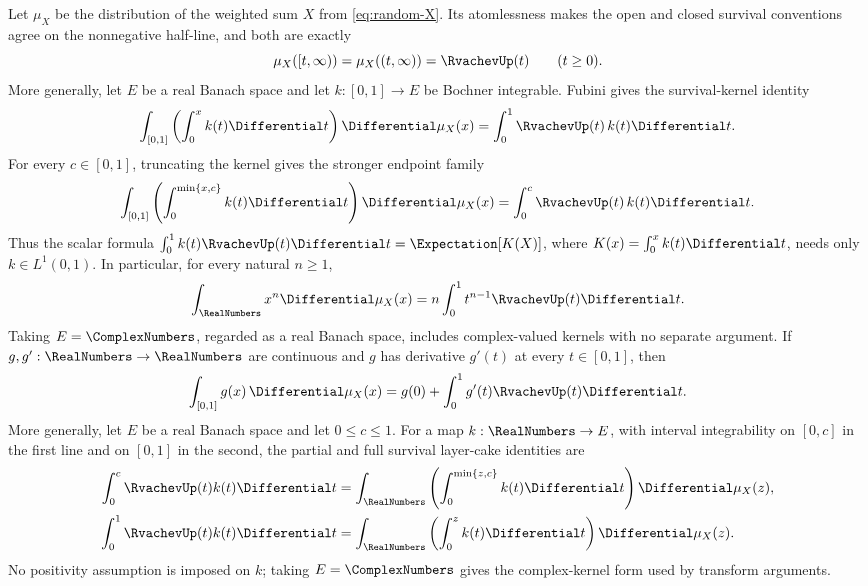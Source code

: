 \documentclass[11pt,oneside]{article}
\theoremstyle{definition}
\theoremstyle{remark}
\begin{document}
Let \(\mu_X\) be the distribution of the weighted sum \(X\) from
\eqref{eq:random-X}.  Its atomlessness makes the open and closed survival
conventions agree on the nonnegative half-line, and both are exactly
\begin{equation}
 \mu_X([t,\infty))=\mu_X((t,\infty))=\RvachevUp(t)
 \qquad(t\ge0).                                                   \label{eq:survival-up}
\end{equation}
More generally, let \(E\) be a real Banach space and let
\(k:[0,1]\to E\) be Bochner integrable.  Fubini gives the
survival-kernel identity
\begin{equation}
 \int_{[0,1]}\left(\int_0^x k(t)\Differential t\right)\Differential\mu_X(x)
 =\int_0^1\RvachevUp(t)\,k(t)\Differential t.                              \label{eq:survival-kernel-banach}
\end{equation}
For every \(c\in[0,1]\), truncating the kernel gives the stronger endpoint
family
\begin{equation}
 \int_{[0,1]}\left(\int_0^{\min\{x,c\}} k(t)\Differential t\right)\Differential\mu_X(x)
 =\int_0^c\RvachevUp(t)\,k(t)\Differential t.                              \label{eq:survival-kernel-clipped}
\end{equation}
Thus the scalar formula
\(\int_0^1 k(t)\RvachevUp(t)\Differential t=\Expectation[K(X)]\), where
\(K(x)=\int_0^xk(t)\Differential t\), needs only \(k\in L^1(0,1)\).
In particular, for every natural \(n\ge1\),
\begin{equation}
 \int_{\RealNumbers}x^n\Differential\mu_X(x)
 =n\int_0^1t^{n-1}\RvachevUp(t)\Differential t.                  \label{eq:survival-up-moments}
\end{equation}
Taking \(E=\ComplexNumbers\), regarded as a real Banach space, includes complex-valued
kernels with no separate argument.
If \(g,g':\RealNumbers\to\RealNumbers\) are continuous and \(g\) has derivative \(g'(t)\) at every
\(t\in[0,1]\), then
\begin{equation}
 \int_{[0,1]}g(x)\,\Differential\mu_X(x)
 =g(0)+\int_0^1g'(t)\RvachevUp(t)\Differential t.                           \label{eq:survival-fubini}
\end{equation}
More generally, let \(E\) be a real Banach space and let \(0\le c\le1\).  For a
map \(k:\RealNumbers\to E\), with interval integrability on \([0,c]\) in the first line
and on \([0,1]\) in the second, the partial and full survival layer-cake
identities are
\begin{align}
 \int_0^c \RvachevUp(t)k(t)\Differential t
 &=\int_{\RealNumbers}\left(\int_0^{\min\{z,c\}}k(t)\Differential t\right)\Differential\mu_X(z),
 \label{eq:survival-layer-cake-partial}\\
 \int_0^1 \RvachevUp(t)k(t)\Differential t
 &=\int_{\RealNumbers}\left(\int_0^z k(t)\Differential t\right)\Differential\mu_X(z).
 \label{eq:survival-layer-cake-full}
\end{align}
No positivity assumption is imposed on \(k\); taking \(E=\ComplexNumbers\) gives the
complex-kernel form used by transform arguments.
\end{document}
